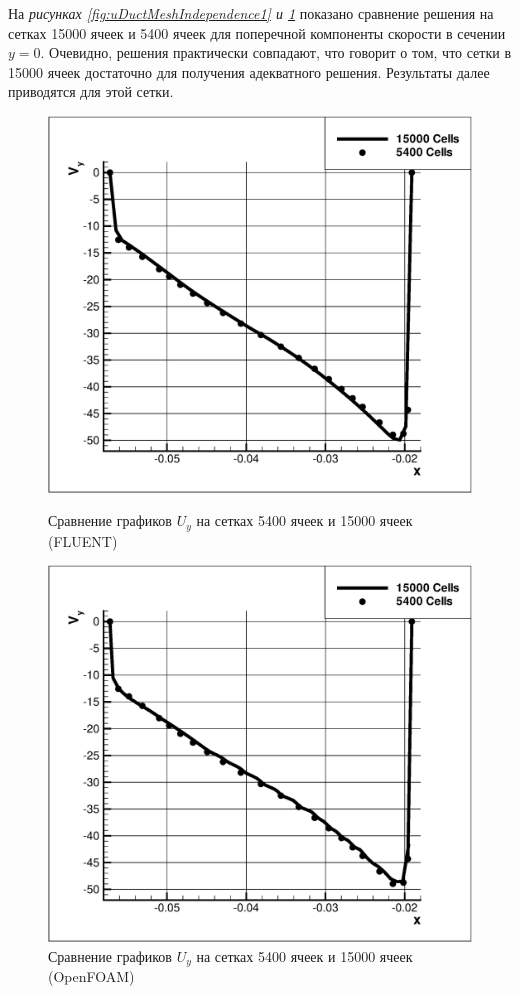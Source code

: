 На \textit{рисунках \ref{fig:uDuctMeshIndependence1} и \ref{fig:uDuctMeshIndependence2}} показано сравнение решения на сетках 15000 ячеек и 5400 ячеек для поперечной компоненты скорости в сечении $y=0$. Очевидно, решения практически совпадают, что говорит о том, что сетки в 15000 ячеек достаточно для получения адекватного решения. Результаты далее приводятся для этой сетки.
\begin{figure}[ht]
	\begin{minipage}{0.475\linewidth}
		\includegraphics[scale=0.33]{uDuctMeshIndependence1}
		\caption{Сравнение графиков $U_y$ на сетках 5400 ячеек и 15000 ячеек (FLUENT)}
		\label{fig:uDuctMeshIndependence1}
	\end{minipage}
	\hspace{0.5em}
	\begin{minipage}{0.475\linewidth}
		\includegraphics[scale=0.33]{uDuctMeshIndependence2}
		\caption{Сравнение графиков $U_y$ на сетках 5400 ячеек и 15000 ячеек (OpenFOAM)}
		\label{fig:uDuctMeshIndependence2}
	\end{minipage}
\end{figure}
